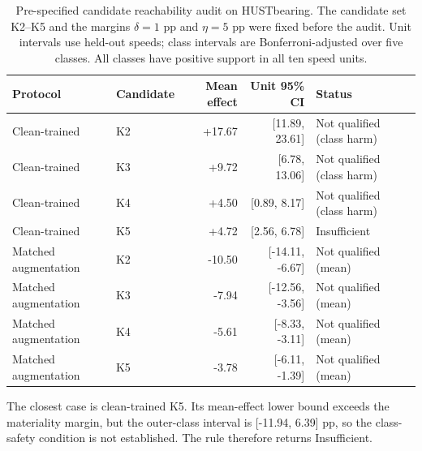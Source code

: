 \begin{table}[t]
\centering
\caption{Pre-specified candidate reachability audit on HUSTbearing. The
candidate set K2--K5 and the margins $\delta=1$ pp and $\eta=5$ pp were fixed
before the audit. Unit intervals use held-out speeds; class intervals are
Bonferroni-adjusted over five classes. All classes have positive support in
all ten speed units.}
\label{tab:candidate-qualification}
\scriptsize
\begin{tabular}{@{}llrrl@{}}
\toprule
Protocol & Candidate & Mean effect & Unit 95\% CI & Status \\
\midrule
Clean-trained & K2 & +17.67 & [11.89, 23.61] & Not qualified (class harm) \\
Clean-trained & K3 & +9.72 & [6.78, 13.06] & Not qualified (class harm) \\
Clean-trained & K4 & +4.50 & [0.89, 8.17] & Not qualified (class harm) \\
Clean-trained & K5 & +4.72 & [2.56, 6.78] & Insufficient \\
Matched augmentation & K2 & -10.50 & [-14.11, -6.67] & Not qualified (mean) \\
Matched augmentation & K3 & -7.94 & [-12.56, -3.56] & Not qualified (mean) \\
Matched augmentation & K4 & -5.61 & [-8.33, -3.11] & Not qualified (mean) \\
Matched augmentation & K5 & -3.78 & [-6.11, -1.39] & Not qualified (mean) \\
\bottomrule
\end{tabular}
\par\smallskip
\parbox{\linewidth}{\footnotesize The closest case is clean-trained K5. Its
mean-effect lower bound exceeds the materiality margin, but the outer-class
interval is [-11.94, 6.39] pp, so the class-safety condition is not
established. The rule therefore returns Insufficient.}
\end{table}
